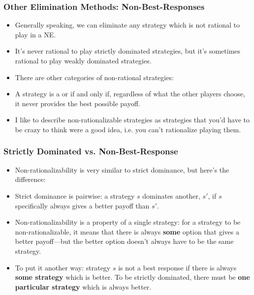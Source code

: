 \begin{frame}
\frametitle{Other Elimination Methods: Non-Best-Responses}
\begin{itemize}
	\item Generally speaking, we can eliminate any strategy which is not rational to play in a NE.
	\item It's never rational to play strictly dominated strategies, but it's sometimes rational to play weakly dominated strategies.
	\item There are other categories of non-rational strategies:
	\item A strategy is a  or  if and only if, regardless of what the other players choose, it never provides the best possible payoff.
	\item I like to describe non-rationalizable strategies as strategies that you'd have to be crazy to think were a good idea, i.e. you can't rationalize playing them.
\end{itemize}
\end{frame}

\begin{frame}
\frametitle{Strictly Dominated vs. Non-Best-Response}
\begin{itemize}
	\item Non-rationalizability is very similar to strict dominance, but here's the difference:
	\item Strict dominance is pairwise: a strategy $s$ dominates another, $s'$, if $s$ specifically always gives a better payoff than $s'$.
	\item Non-rationalizability is a property of a single strategy: for a strategy to be non-rationalizable, it means that there is always \textbf{some} option that gives a better payoff---but the better option doesn't always have to be the same strategy.
	\item To put it another way: strategy $s$ is not a best response if there is always \textbf{some strategy} which is better. To be strictly dominated, there must be \textbf{one particular strategy} which is always better.
\end{itemize}
\end{frame}

